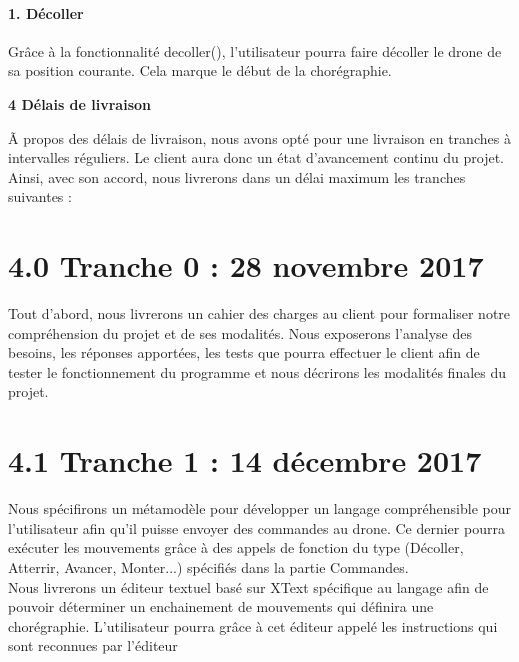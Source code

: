 \documentclass{article}
\begin{document}
\paragraph{1. D\'ecoller\\}
Gr\^ace \`a la fonctionnalit\'e decoller(), l'utilisateur pourra faire d\'ecoller le drone de sa position courante. Cela marque le d\'ebut de la chor\'egraphie.

\newpage
\noindent \Huge \textbf{4 D\'elais de livraison}
\vspace{1\baselineskip}
\normalsize

Ã propos des d\'elais de livraison, nous avons opt\'e pour une livraison en tranches \`a intervalles r\'eguliers. Le client aura donc un \'etat d'avancement continu du projet. Ainsi, avec son accord, nous livrerons dans un d\'elai maximum les tranches suivantes :

\section*{4.0 Tranche 0 : 28 novembre 2017}
\vspace{1\baselineskip}
Tout d'abord, nous livrerons un cahier des charges au client pour formaliser notre compr\'ehension du projet et de ses modalit\'es. Nous exposerons l'analyse des besoins, les r\'eponses apport\'ees, les tests que pourra effectuer le client afin de tester le fonctionnement du programme et nous d\'ecrirons les modalit\'es finales du projet.

\section*{4.1 Tranche 1 : 14 d\'ecembre 2017}
\normalsize
\vspace{1\baselineskip}

Nous sp\'ecifirons un m\'etamod\`ele pour d\'evelopper un langage compr\'ehensible pour l'utilisateur afin qu'il puisse envoyer des commandes au drone. Ce dernier pourra ex\'ecuter les mouvements gr\^ace \`a des appels de fonction du type (D\'ecoller, Atterrir, Avancer, Monter...) sp\'ecifi\'es dans la partie Commandes.\\
Nous livrerons un \'editeur textuel bas\'e sur XText  sp\'ecifique au langage afin de pouvoir d\'eterminer un enchainement de mouvements qui d\'efinira une chor\'egraphie. L'utilisateur pourra gr\^ace \`a cet \'editeur appel\'e les instructions qui sont reconnues par l'\'editeur
\end{document}
